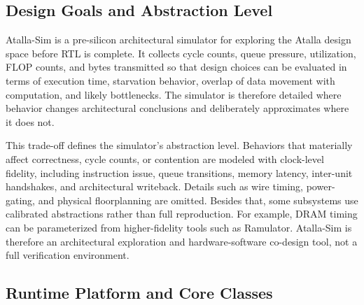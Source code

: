 \subsection{Design Goals and Abstraction Level}
Atalla-Sim is a pre-silicon architectural simulator for exploring the Atalla design space before RTL is complete. It collects cycle counts, queue pressure, utilization, FLOP counts, and bytes transmitted so that design choices can be evaluated in terms of execution time, starvation behavior, overlap of data movement with computation, and likely bottlenecks. The simulator is therefore detailed where behavior changes architectural conclusions and deliberately approximates where it does not.

This trade-off defines the simulator's abstraction level. Behaviors that materially affect correctness, cycle counts, or contention are modeled with clock-level fidelity, including instruction issue, queue transitions, memory latency, inter-unit handshakes, and architectural writeback. Details such as wire timing, power-gating, and physical floorplanning are omitted. Besides that, some subsystems use calibrated abstractions rather than full reproduction. For example, DRAM timing can be parameterized from higher-fidelity tools such as Ramulator\cite{ramulator}. Atalla-Sim is therefore an architectural exploration and hardware-software co-design tool, not a full verification environment.

\subsection{Runtime Platform and Core Classes}

